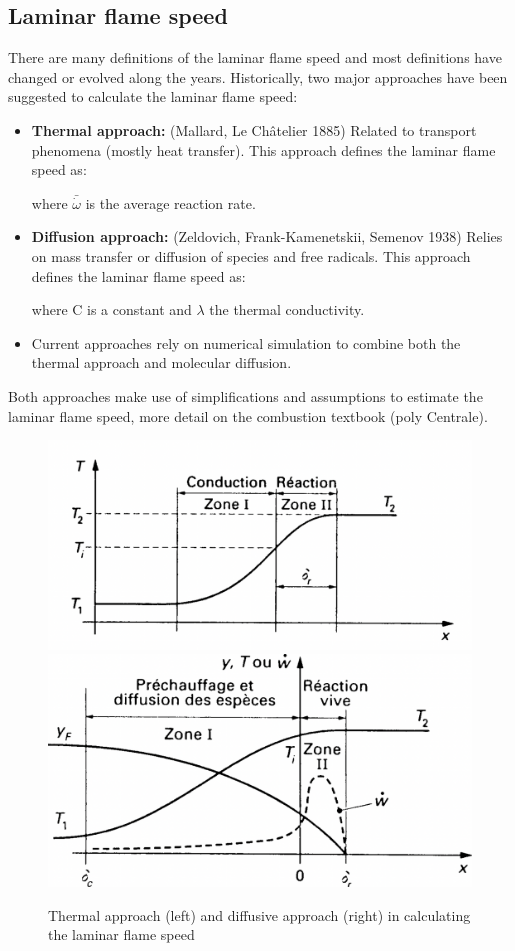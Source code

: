 \documentclass[a4paper,11pt]{article}
\begin{document}
\subsection{Laminar flame speed}
There are many definitions of the laminar flame speed and most definitions have changed or evolved along the years. Historically, two major approaches have been suggested to calculate the laminar flame speed:
\begin{itemize}
		\item \textbf{Thermal approach:} (Mallard, Le Châtelier 1885) Related to transport phenomena (mostly heat transfer). This approach defines the laminar flame speed as:
		\begin{center}
		\end{center}
	where $\bar{\dot{\omega}}$ is the average reaction rate.
		\item \textbf{Diffusion approach:} (Zeldovich, Frank-Kamenetskii, Semenov 1938) Relies on mass transfer or diffusion of species and free radicals. This approach defines the laminar flame speed as:
		\begin{center}
		\end{center}
		where C is a constant and $\lambda$ the thermal conductivity.
		\item Current approaches rely on numerical simulation to combine both the thermal approach and molecular diffusion.
\end{itemize}
Both approaches make use of simplifications and assumptions to estimate the laminar flame speed, more detail on the combustion textbook (poly Centrale).

\begin{figure}[ht]
	\centering
	\includegraphics[width=.49\linewidth]{figures/thermal.png}
	\includegraphics[width=.49\linewidth]{figures/diffu.png}
	\caption{Thermal approach (left) and diffusive approach (right) in calculating the laminar flame speed}
\end{figure}
\end{document}
